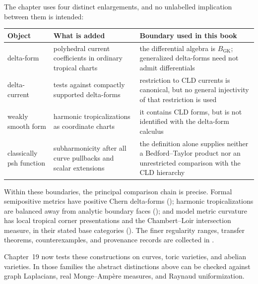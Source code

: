 The chapter uses four distinct enlargements, and no unlabelled implication
between them is intended:
\begin{center}
\small
\begin{tabular}{@{}p{}|p{}|p{}@{}}
\textbf{Object}&\textbf{What is added}&\textbf{Boundary used in this book}\\ \hline
delta-form
 &polyhedral current coefficients in ordinary tropical charts
 &the differential algebra is $B_{\mathrm{GK}}$; generalized delta-forms
  need not admit differentials\\
delta-current
 &tests against compactly supported delta-forms
 &restriction to CLD currents is canonical, but no general injectivity of
  that restriction is used\\
weakly smooth form
 &harmonic tropicalizations as coordinate charts
 &it contains CLD forms, but is not identified with the delta-form calculus\\
classically psh function
 &subharmonicity after all curve pullbacks and scalar extensions
 &the definition alone supplies neither a Bedford--Taylor product nor an
  unrestricted comparison with the CLD hierarchy\\
\end{tabular}
\end{center}

Within these boundaries, the principal comparison chain is precise.  Formal
semipositive metrics have positive Chern delta-forms
(); harmonic tropicalizations are
balanced away from analytic boundary faces
(); and model metric curvature has local
tropical corner presentations and the
Chambert--Loir intersection measure, in their stated base categories
().  The finer regularity ranges, transfer
theorems, counterexamples, and provenance records are collected in
.

Chapter~19 now tests these constructions on curves, toric varieties, and
abelian varieties.  In those families the abstract distinctions above can
be checked against graph Laplacians, real Monge--Amp\`ere measures, and
Raynaud uniformization.
